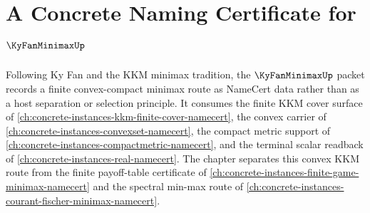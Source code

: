 \chapter{A Concrete Naming Certificate for $\KyFanMinimaxUp$}
\label{ch:concrete-instances-ky-fan-minimax-namecert}

Following Ky Fan and the KKM minimax tradition, the $\KyFanMinimaxUp$ packet records a finite convex-compact minimax route as NameCert data rather than as a host separation or selection principle. It consumes the finite KKM cover surface of \autoref{ch:concrete-instances-kkm-finite-cover-namecert}, the convex carrier of \autoref{ch:concrete-instances-convexset-namecert}, the compact metric support of \autoref{ch:concrete-instances-compactmetric-namecert}, and the terminal scalar readback of \autoref{ch:concrete-instances-real-namecert}. The chapter separates this convex KKM route from the finite payoff-table certificate of \autoref{ch:concrete-instances-finite-game-minimax-namecert} and the spectral min-max route of \autoref{ch:concrete-instances-courant-fischer-minimax-namecert}.

